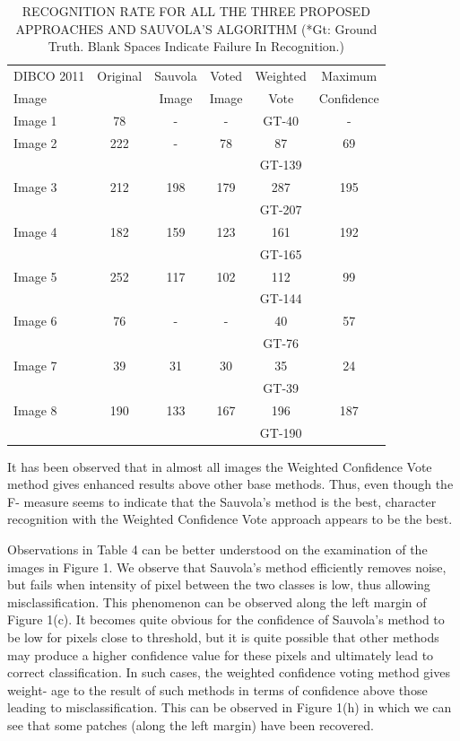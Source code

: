 \documentclass[conference]{IEEEtran}
\begin{document}
\begin{table}[!t]
\caption{RECOGNITION RATE FOR ALL THE THREE PROPOSED APPROACHES AND SAUVOLA'S ALGORITHM (*Gt: Ground Truth. Blank Spaces Indicate Failure In Recognition.)}
\centering
\begin{tabular}{|l|c|c|c|c|c|}
\hline
DIBCO 2011 & Original & Sauvola & Voted & Weighted & Maximum \\
Image      &          & Image   & Image & Vote    & Confidence \\
\hline
Image 1 & 78 & - & - & GT-40 & - \\
Image 2 & 222 & - & 78 & 87 & 69 \\
        &     &   &    & GT-139 & \\
Image 3 & 212 & 198 & 179 & 287 & 195 \\
        &     &     &     & GT-207 & \\
Image 4 & 182 & 159 & 123 & 161 & 192 \\
        &     &     &     & GT-165 & \\
Image 5 & 252 & 117 & 102 & 112 & 99 \\
        &     &     &     & GT-144 & \\
Image 6 & 76 & - & - & 40 & 57 \\
        &    &   &   & GT-76 & \\
Image 7 & 39 & 31 & 30 & 35 & 24 \\
        &    &    &    & GT-39 & \\
Image 8 & 190 & 133 & 167 & 196 & 187 \\
        &     &     &     & GT-190 & \\
\hline
\end{tabular}
\label{tab:recognition}
\end{table}

It has been observed that in almost all images the Weighted Confidence Vote method gives enhanced results above other base methods. Thus, even though the F- measure seems to indicate that the Sauvola's method is the best, character recognition with the Weighted Confidence Vote approach appears to be the best.

Observations in Table 4 can be better understood on the examination of the images in Figure 1. We observe that Sauvola's method efficiently removes noise, but fails when intensity of pixel between the two classes is low, thus allowing misclassification. This phenomenon can be observed along the left margin of Figure 1(c). It becomes quite obvious for the confidence of Sauvola's method to be low for pixels close to threshold, but it is quite possible that other methods may produce a higher confidence value for these pixels and ultimately lead to correct classification. In such cases, the weighted confidence voting method gives weight- age to the result of such methods in terms of confidence above those leading to misclassification. This can be observed in Figure 1(h) in which we can see that some patches (along the left margin) have been recovered.
\end{document}
